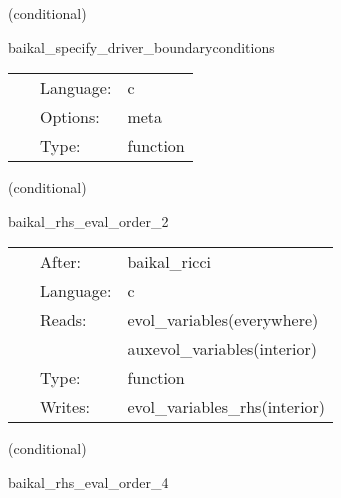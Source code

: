 \vspace{5mm}

   (conditional) 

\hspace{5mm} baikal\_specify\_driver\_boundaryconditions 

\hspace{5mm}{\it register boundary conditions in presync bin driver\_boundaryselect. } 


\hspace{5mm}

 \begin{tabular*}{160mm}{cll} 
~ & Language:  & c \\ 
~ & Options:  & meta \\ 
~ & Type:  & function \\ 
\end{tabular*} 


\vspace{5mm}

   (conditional) 

\hspace{5mm} baikal\_rhs\_eval\_order\_2 

\hspace{5mm}{\it evaluate bssn rhss, at finite-differencing order 2 } 


\hspace{5mm}

 \begin{tabular*}{160mm}{cll} 
~ & After:  & baikal\_ricci \\ 
~ & Language:  & c \\ 
~ & Reads:  & evol\_variables(everywhere) \\ 
~& ~ &auxevol\_variables(interior)\\ 
~ & Type:  & function \\ 
~ & Writes:  & evol\_variables\_rhs(interior) \\ 
\end{tabular*} 


\vspace{5mm}

   (conditional) 

\hspace{5mm} baikal\_rhs\_eval\_order\_4 

\hspace{5mm}{\it evaluate bssn rhss, at finite-differencing order 4 } 


\hspace{5mm}

